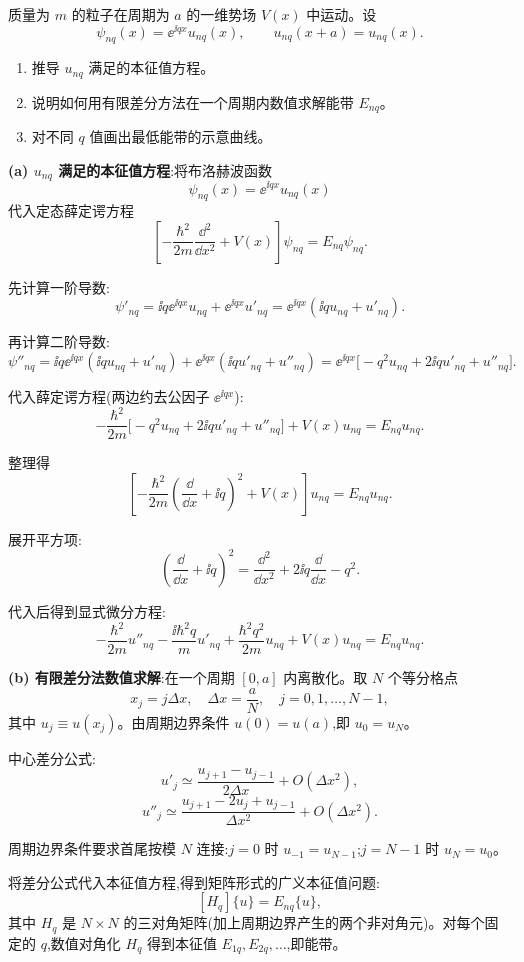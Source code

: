 \begin{question}
质量为 $m$ 的粒子在周期为 $a$ 的一维势场 $V(x)$ 中运动。设
\[
\psi_{nq}(x)=\ee^{\ii qx}u_{nq}(x),\qquad u_{nq}(x+a)=u_{nq}(x).
\]
\begin{enumerate}
\item 推导 $u_{nq}$ 满足的本征值方程。
\item 说明如何用有限差分方法在一个周期内数值求解能带 $E_{nq}$。
\item 对不同 $q$ 值画出最低能带的示意曲线。
\end{enumerate}
\begin{solution}
	\textbf{(a) $u_{nq}$ 满足的本征值方程}:将布洛赫波函数
	\[
	\psi_{nq}(x)=\ee^{\ii qx}u_{nq}(x)
	\]
	代入定态薛定谔方程
	\[
	\left[-\frac{\hbar^2}{2m}\frac{\dd^2}{\dd x^2}+V(x)\right]\psi_{nq}=E_{nq}\psi_{nq}.
	\]

	先计算一阶导数:
	\[
	\psi'_{nq}= \ii q \ee^{\ii qx}u_{nq}+ \ee^{\ii qx}u'_{nq}=\ee^{\ii qx}(\ii q u_{nq}+u'_{nq}).
	\]

	再计算二阶导数:
	\[
	\psi''_{nq}= \ii q \ee^{\ii qx}(\ii q u_{nq}+u'_{nq})+ \ee^{\ii qx}(\ii q u'_{nq}+u''_{nq})
	=\ee^{\ii qx}\big[-\!q^2u_{nq}+2\ii q u'_{nq}+u''_{nq}\big].
	\]

	代入薛定谔方程(两边约去公因子 $\ee^{\ii qx}$):
	\[
	-\frac{\hbar^2}{2m}\big[-q^2u_{nq}+2\ii q u'_{nq}+u''_{nq}\big]+V(x)u_{nq}=E_{nq}u_{nq}.
	\]

	整理得
	\[
	\left[-\frac{\hbar^2}{2m}\left(\frac{\dd}{\dd x}+\ii q\right)^2+V(x)\right]u_{nq}=E_{nq}u_{nq}.
	\]

	展开平方项:
	\[
	\left(\frac{\dd}{\dd x}+\ii q\right)^2=\frac{\dd^2}{\dd x^2}+2\ii q\frac{\dd}{\dd x}-q^2.
	\]

	代入后得到显式微分方程:
	\[
	-\frac{\hbar^2}{2m}u''_{nq}-\frac{\ii\hbar^2 q}{m}u'_{nq}+\frac{\hbar^2 q^2}{2m}u_{nq}+V(x)u_{nq}=E_{nq}u_{nq}.
	\]

	\textbf{(b) 有限差分法数值求解}:在一个周期 $[0,a]$ 内离散化。取 $N$ 个等分格点
	\[
	x_j=j\Delta x,\quad \Delta x=\frac{a}{N},\quad j=0,1,\ldots,N-1,
	\]
	其中 $u_j\equiv u(x_j)$。由周期边界条件 $u(0)=u(a)$,即 $u_0=u_N$。

	中心差分公式:
	\[
	u'_j\simeq\frac{u_{j+1}-u_{j-1}}{2\Delta x}+O(\Delta x^2),
	\]
	\[
	u''_j\simeq\frac{u_{j+1}-2u_j+u_{j-1}}{\Delta x^2}+O(\Delta x^2).
	\]

	周期边界条件要求首尾按模 $N$ 连接:$j=0$ 时 $u_{-1}=u_{N-1}$;$j=N-1$ 时 $u_N=u_0$。

	将差分公式代入本征值方程,得到矩阵形式的广义本征值问题:
	\[
	[H_q]\{u\}=E_{nq}\{u\},
	\]
	其中 $H_q$ 是 $N\times N$ 的三对角矩阵(加上周期边界产生的两个非对角元)。对每个固定的 $q$,数值对角化 $H_q$ 得到本征值 $E_{1q},E_{2q},\ldots$,即能带。


\end{solution}
\end{question}
